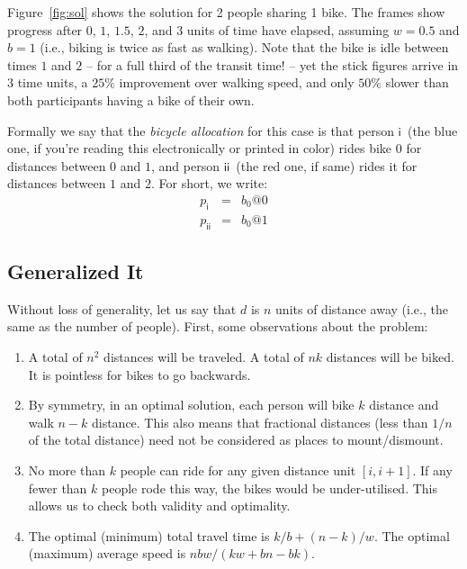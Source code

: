 \documentclass[DIV=calc, paper=a4, fontsize=11pt, twocolumn]{scrartcl}	 %
\newcommand{\initial}[1]{ %
\lettrine[lines=3,lhang=0.3,nindent=0em]{
\color{DarkGoldenrod}
{\textsf{#1}}}{}}
\begin{document}
\initial{F}igure~\ref{fig:sol} shows the solution for 2 people sharing 1 bike.
The frames show progress after $0$, $1$, $1.5$, $2$, and $3$ units of time have elapsed, assuming $w=0.5$ and $b=1$ (i.e., biking is twice as fast as walking).
Note that the bike is idle between times $1$ and $2$ -- for a full third of the transit time! -- yet the stick figures arrive in $3$ time units, a $25\%$ improvement over walking speed, and only $50\%$ slower than both participants having a bike of their own.

\newcommand\PA{\ensuremath{\mathsf{i}}}
\newcommand\PB{\ensuremath{\mathsf{ii}}}
\newcommand\PC{\ensuremath{\mathsf{iii}}}
\newcommand\PD{\ensuremath{\mathsf{iv}}}
\newcommand\PE{\ensuremath{\mathsf{v}}}
Formally we say that the {\em bicycle allocation} for this case is that person \PA~(the blue one, if you're reading this electronically or printed in color) rides bike $0$ for distances between $0$ and $1$, and person \PB~(the red one, if same) rides it for distances between $1$ and $2$. For short, we write:
\begin{eqnarray*}
	p_\PA &=& b_0@0 \\
	p_\PB &=& b_0@1
\end{eqnarray*}

\subsection{Generalized It}

\initial{W}ithout loss of generality, let us say that $d$ is $n$ units of distance away (i.e., the same as the number of people).
First, some observations about the problem:
\begin{enumerate}
	\setlength{\itemsep}{-0.5em}
	\item A total of $n^2$ distances will be traveled. A total of $nk$ distances will be biked. It is pointless for bikes to go backwards.
	\item By symmetry, in an optimal solution, each person will bike $k$ distance and walk $n-k$ distance. This also means that fractional distances (less than $1/n$ of the total distance) need not be considered as places to mount/dismount.
	\item No more than $k$ people can ride for any given distance unit $[i,i+1]$. If any fewer than $k$ people rode this way, the bikes would be under-utilised. This allows us to check both validity and optimality.
	\item The optimal (minimum) total travel time is $k/b + (n-k)/w$. The optimal (maximum) average speed is $nbw/(kw+bn-bk)$.
\end{enumerate}
\end{document}

